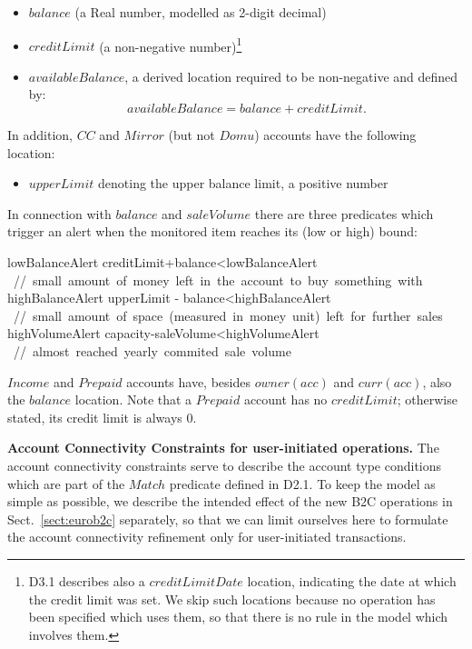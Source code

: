 \begin{itemize}
	\item $balance$ (a Real number, modelled as 2-digit decimal)
	
	\item $creditLimit$ (a non-negative number)\footnote{D3.1 describes also a $creditLimitDate$ location, indicating the date at which the credit limit was set. We skip such locations because no operation has been specified which uses them, so that there is no rule in the model which involves them.}
	
	\item $availableBalance$, a derived location required to be non-negative and defined by:
	\[availableBalance=balance+creditLimit.\]
\end{itemize}

In addition, $CC$ and $Mirror$ (but not $Domu$) accounts have the following  location:
\begin{itemize}
\item $upperLimit$ denoting the upper balance limit, a positive number
\end{itemize}
In connection with $balance$ and $saleVolume$ there are three predicates which trigger an alert when the monitored item reaches its (low or high) bound:
\begin{asm}
lowBalanceAlert \IFF creditLimit+balance<lowBalanceAlert \+
   \mbox{ // small amount of money left in the account to buy something with}\-
highBalanceAlert \IFF upperLimit - balance<highBalanceAlert \+
        \mbox{ // small amount of space (measured in money unit) left for further sales}\-
highVolumeAlert \IFF capacity-saleVolume<highVolumeAlert \+
           \mbox{ // almost reached yearly commited sale volume}
\end{asm}

$Income$ and $Prepaid$ accounts have, besides  $owner(acc)$ and $curr(acc)$, also the $balance$ location. Note that a $Prepaid$ account has no $creditLimit$; otherwise stated, its credit limit is always 0.


{\bf Account Connectivity Constraints for user-initiated operations.} The account connectivity constraints serve to describe the account type conditions which are part 
of the $Match$ predicate defined in D2.1. To keep the model as simple as possible, 
we describe the intended effect of the new B2C operations in Sect.~\ref{sect:eurob2c} separately, so that we can limit ourselves here to formulate the account connectivity refinement only for user-initiated transactions.

